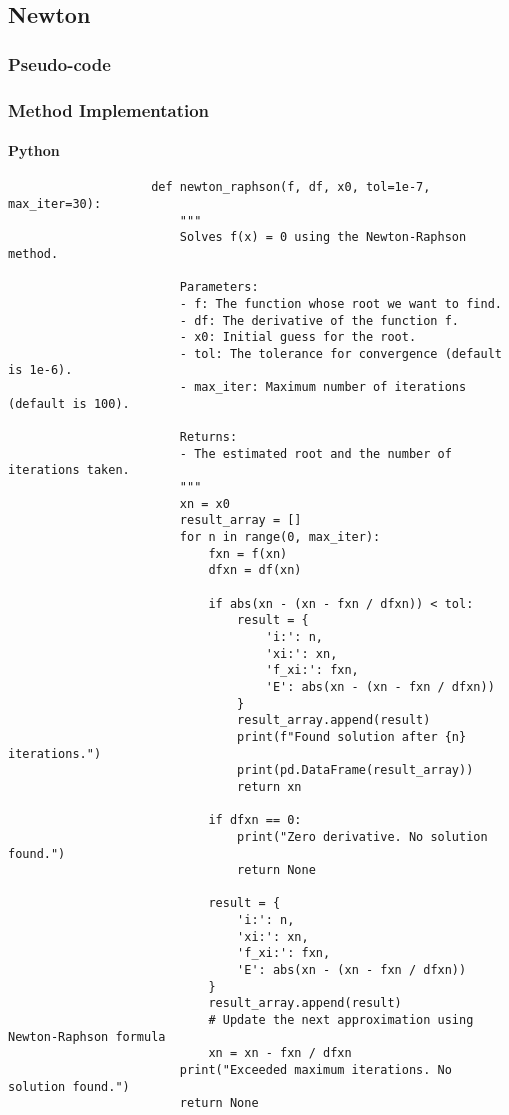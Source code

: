 \documentclass{article}
\begin{document}
    \subsection{Newton}
        \subsubsection{Pseudo-code}
        \subsubsection{Method Implementation}
            \paragraph{Python}
                \begin{verbatim}
                    def newton_raphson(f, df, x0, tol=1e-7, max_iter=30):
                        """
                        Solves f(x) = 0 using the Newton-Raphson method.

                        Parameters:
                        - f: The function whose root we want to find.
                        - df: The derivative of the function f.
                        - x0: Initial guess for the root.
                        - tol: The tolerance for convergence (default is 1e-6).
                        - max_iter: Maximum number of iterations (default is 100).

                        Returns:
                        - The estimated root and the number of iterations taken.
                        """
                        xn = x0
                        result_array = []
                        for n in range(0, max_iter):
                            fxn = f(xn)
                            dfxn = df(xn)

                            if abs(xn - (xn - fxn / dfxn)) < tol:
                                result = {
                                    'i:': n,
                                    'xi:': xn,
                                    'f_xi:': fxn,
                                    'E': abs(xn - (xn - fxn / dfxn))
                                }
                                result_array.append(result)
                                print(f"Found solution after {n} iterations.")
                                print(pd.DataFrame(result_array))
                                return xn

                            if dfxn == 0:
                                print("Zero derivative. No solution found.")
                                return None

                            result = {
                                'i:': n,
                                'xi:': xn,
                                'f_xi:': fxn,
                                'E': abs(xn - (xn - fxn / dfxn))
                            }
                            result_array.append(result)
                            # Update the next approximation using Newton-Raphson formula
                            xn = xn - fxn / dfxn
                        print("Exceeded maximum iterations. No solution found.")
                        return None
                \end{verbatim}
\end{document}
